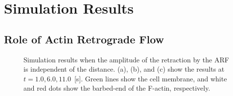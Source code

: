 \documentclass[a4paper,12pt, oneside]{book}
\begin{document}
\section{Simulation Results}
\subsection{Role of Actin Retrograde Flow}
\begin{figure}[tbp]
 \caption{ Simulation results when the amplitude of the retraction by the ARF is independent of the distance. (a), (b), and (c) show the results at $t = 1.0, 6.0, 11.0$~[s]. Green lines show the cell membrane, and white and red dots show the barbed-end of the F-actin, respectively.}
 \label{fig:res0}
\end{figure}
\end{document}
